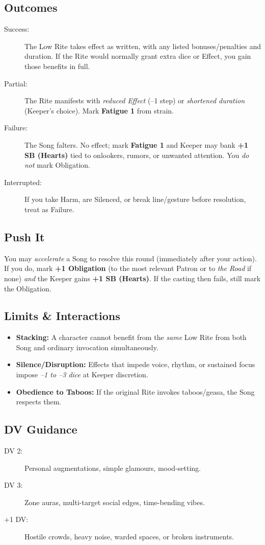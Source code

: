 \subsection*{Outcomes}
\begin{description}
\item[Success:] The Low Rite takes effect as written, with any listed bonuses/penalties and duration. If the Rite would normally grant extra dice or Effect, you gain those benefits in full.
\item[Partial:] The Rite manifests with \emph{reduced Effect} (–1 step) or \emph{shortened duration} (Keeper’s choice). Mark \textbf{Fatigue 1} from strain.
\item[Failure:] The Song falters. No effect; mark \textbf{Fatigue 1} and Keeper may bank \textbf{+1 SB (Hearts)} tied to onlookers, rumors, or unwanted attention. You \emph{do not} mark Obligation.
\item[Interrupted:] If you take Harm, are Silenced, or break line/gesture before resolution, treat as Failure.
\end{description}

\subsection*{Push It}
You may \emph{accelerate} a Song to resolve this round (immediately after your action). If you do, mark \textbf{+1 Obligation} (to the most relevant Patron or to \emph{the Road} if none) \emph{and} the Keeper gains \textbf{+1 SB (Hearts)}. If the casting then fails, still mark the Obligation.

\subsection*{Limits \& Interactions}
\begin{itemize}
\item \textbf{Stacking:} A character cannot benefit from the \emph{same} Low Rite from both Song and ordinary invocation simultaneously.
\item \textbf{Silence/Disruption:} Effects that impede voice, rhythm, or sustained focus impose \emph{–1 to –3 dice} at Keeper discretion.
\item \textbf{Obedience to Taboos:} If the original Rite invokes taboos/geasa, the Song respects them.
\end{itemize}

\subsection*{DV Guidance}
\label{talent:cantors-path-dv}
\begin{description}
\item[DV 2:] Personal augmentations, simple glamours, mood-setting.
\item[DV 3:] Zone auras, multi-target social edges, time-bending vibes.
\item[+1 DV:] Hostile crowds, heavy noise, warded spaces, or broken instruments.
\end{description}

